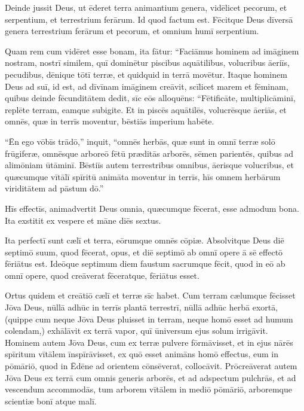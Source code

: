 \Versus Deinde jussit Deus, ut ēderet terra animantium genera, vidēlicet pecorum, et serpentium, et terrestrium ferārum. Id quod factum est.
\Versus Fēcitque Deus dīversā genera terrestrium ferārum et pecorum, et omnium humī serpentium.


Quam rem cum vidēret esse bonam,
\Versus ita fātur: ``Faciāmus hominem ad imāginem nostram, nostrī similem, quī dominētur piscibus aquātilibus, volucribus āeriīs, pecudibus, dēnique tōtī terræ, et quidquid in terrā movētur.
\Versus Itaque hominem Deus ad suī, id est, ad dīvīnam imāginem creāvit, scīlicet marem et fēminam,
\Versus quibus deinde fēcunditātem dedit, sīc eōs alloquēns: ``Fētificāte, multiplicāminī, replēte terram, eamque subigite. Et in piscēs aquātilēs, volucrēsque āeriās, et omnēs, quæ in terrīs moventur, bēstiās imperium habēte.

\Versus ``Ēn ego vōbīs trādō,'' inquit, ``omnēs herbās, quæ sunt in omnī terræ solō frūgiferæ, omnēsque arboreō fētū præditās arborēs, sēmen parientēs, quibus ad alimōniam ūtāminī.
\Versus Bēstiīs autem terrestribus omnibus, āerisque volucribus, et quæcumque vītālī spīritū animāta moventur in terrīs, hīs omnem herbārum viriditātem ad pāstum dō.''

\Versus Hīs effectīs, animadvertit Deus omnia, quæcumque fēcerat, esse admodum bona. Ita exstitit ex vespere et māne diēs sextus.



\Caput
\Versus Ita perfectī sunt cælī et terra, eōrumque omnēs cōpiæ.
\Versus Absolvitque Deus diē septimō suum, quod fēcerat, opus, et diē septimō ab omnī opere ā sē effectō fēriātus est.
\Versus Ideōque septimum diem faustum sacrumque fēcit, quod in eō ab omnī opere, quod creāverat fēceratque, fēriātus esset.%


\Versus Ortus quidem et creātiō cælī et terræ sīc habet. Cum terram cælumque fēcisset Jōva Deus,
\Versus nūllā adhūc in terrīs plantā terrestrī, nūllā adhūc herbā exortā, (quippe cum neque Jōva Deus pluisset in terram, neque homō esset ad humum colendam,)
\Versus exhālāvit ex terrā vapor, quī ūniversum ejus solum irrigāvit.
\Versus Hominem autem Jōva Deus, cum ex terræ pulvere fōrmāvisset, et in ejus nārēs spīritum vītālem īnspīrāvisset, ex quō esset animāns homō effectus,
\Versus eum in pōmāriō, quod in Ēdēne ad orientem cōnsēverat, collocāvit.
\Versus Prōcreāverat autem Jōva Deus ex terrā cum omnis generis arborēs, et ad adspectum pulchrās, et ad vescendum accommodās, tum arborem vītālem in mediō pōmāriō, arboremque scientiæ bonī atque malī.

